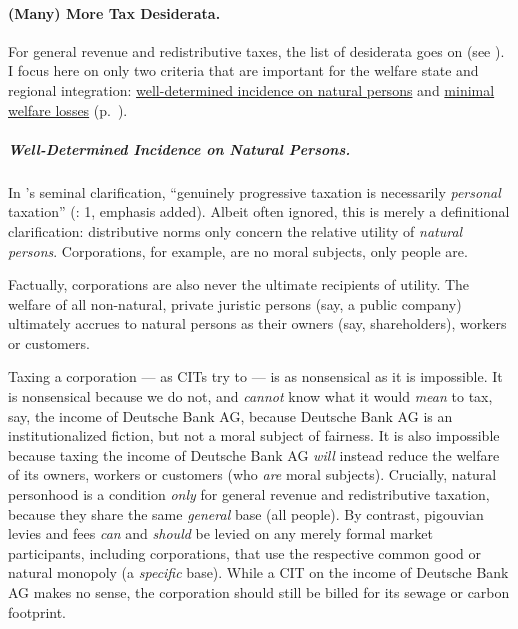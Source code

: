 \paragraph[Tax Desiderata]{(Many) More Tax Desiderata.} For general revenue and redistributive taxes, the list of desiderata goes on (see \citealt{Held2010a}). I focus here on only two criteria that are important for the welfare state and regional integration: \hyperref[sec:well-determinedincidence]{well-determined incidence on natural persons} and \hyperref[sec:minimalDWL]{minimal welfare losses} (p.~\pageref{sec:minimalDWL}). 

\subparagraph[Incidence]{Well-Determined Incidence on Natural Persons.} \label{sec:well-determinedincidence} In \citeauthor{Vickrey1947}'s seminal clarification, ``genuinely progressive taxation is necessarily \emph{personal} taxation'' (\citeyear{Vickrey1947}: 1, emphasis added). Albeit often ignored, this is merely a definitional clarification: distributive norms only concern the relative utility of \emph{natural persons}. Corporations, for example, are no moral subjects, only people are. 

Factually, corporations are also never the ultimate recipients of utility. The welfare of all non-natural, private juristic persons (say, a public company) ultimately accrues to natural persons as their owners (say, shareholders), workers or customers. 

Taxing a corporation --- as \glspl{CIT} try to --- is as nonsensical as it is impossible. It is nonsensical because we do not, and \emph{cannot} know what it would \emph{mean} to tax, say, the income of Deutsche Bank AG, because Deutsche Bank AG is an institutionalized fiction, but not a moral subject of fairness. It is also impossible because taxing the income of Deutsche Bank AG \emph{will} instead reduce the welfare of its owners, workers or customers (who \emph{are} moral subjects).
Crucially, natural personhood is a condition \emph{only} for general revenue and redistributive taxation, because they share the same \emph{general} base (all people). By contrast, pigouvian levies and fees \emph{can} and \emph{should} be levied on any merely formal market participants, including corporations, that use the respective common good or natural monopoly (a \emph{specific} base). While a \gls{CIT} on the income of Deutsche Bank AG makes no sense, the corporation should still be billed for its sewage or carbon footprint.

